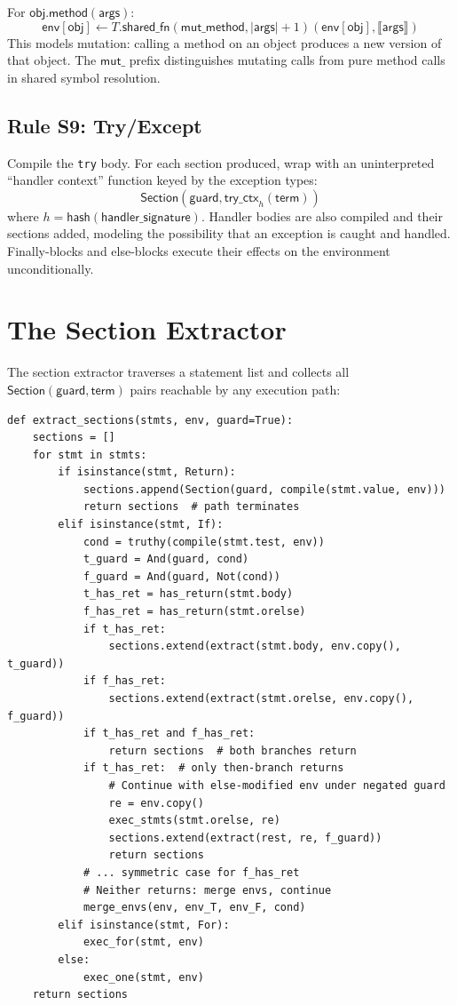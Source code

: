 \documentclass[11pt,a4paper]{report}
\theoremstyle{definition}
\theoremstyle{plain}
\newcommand{\den}[1]{\llbracket #1 \rrbracket}
\begin{document}
For $\mathsf{obj.method}(\mathsf{args})$:
\[
  \mathsf{env}[\mathsf{obj}] \leftarrow T.\mathsf{shared\_fn}(
    \mathsf{mut\_method}, |\mathsf{args}|+1)(\mathsf{env}[\mathsf{obj}],
    \den{\mathsf{args}})
\]
This models mutation: calling a method on an object produces a new
version of that object.  The $\mathsf{mut\_}$ prefix distinguishes
mutating calls from pure method calls in shared symbol resolution.

\subsection{Rule S9: Try/Except}

Compile the \texttt{try} body.  For each section produced, wrap with
an uninterpreted ``handler context'' function keyed by the exception
types:
\[
  \mathsf{Section}(\mathsf{guard}, \mathsf{try\_ctx}_{h}(\mathsf{term}))
\]
where $h = \mathsf{hash}(\mathsf{handler\_signature})$.  Handler
bodies are also compiled and their sections added, modeling the
possibility that an exception is caught and handled.
Finally-blocks and else-blocks execute their effects on the
environment unconditionally.

\section{The Section Extractor}

The section extractor traverses a statement list and collects all
$\mathsf{Section}(\mathsf{guard}, \mathsf{term})$ pairs reachable
by any execution path:

\begin{lstlisting}[caption={Section extraction algorithm}]
def extract_sections(stmts, env, guard=True):
    sections = []
    for stmt in stmts:
        if isinstance(stmt, Return):
            sections.append(Section(guard, compile(stmt.value, env)))
            return sections  # path terminates
        elif isinstance(stmt, If):
            cond = truthy(compile(stmt.test, env))
            t_guard = And(guard, cond)
            f_guard = And(guard, Not(cond))
            t_has_ret = has_return(stmt.body)
            f_has_ret = has_return(stmt.orelse)
            if t_has_ret:
                sections.extend(extract(stmt.body, env.copy(), t_guard))
            if f_has_ret:
                sections.extend(extract(stmt.orelse, env.copy(), f_guard))
            if t_has_ret and f_has_ret:
                return sections  # both branches return
            if t_has_ret:  # only then-branch returns
                # Continue with else-modified env under negated guard
                re = env.copy()
                exec_stmts(stmt.orelse, re)
                sections.extend(extract(rest, re, f_guard))
                return sections
            # ... symmetric case for f_has_ret
            # Neither returns: merge envs, continue
            merge_envs(env, env_T, env_F, cond)
        elif isinstance(stmt, For):
            exec_for(stmt, env)
        else:
            exec_one(stmt, env)
    return sections
\end{lstlisting}
\end{document}
